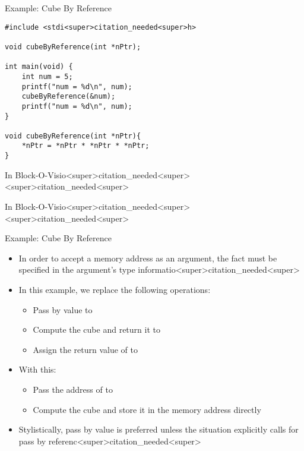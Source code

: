 \documentclass[11pt]{beamer}
\let\OldTexttt\texttt
\renewcommand{\texttt}[1]{\OldTexttt{\color{teal}{#1}}}
\begin{document}
\begin{frame}[fragile=singleslide]{Example: Cube By Reference}
\begin{lstlisting}[style=C]
#include <stdi<super>citation_needed<super>h>

void cubeByReference(int *nPtr);

int main(void) {
	int num = 5;
	printf("num = %d\n", num);
	cubeByReference(&num);
	printf("num = %d\n", num);
}

void cubeByReference(int *nPtr){
	*nPtr = *nPtr * *nPtr * *nPtr;
}
\end{lstlisting}
\end{frame}

\begin{frame}{In Block-O-Visio<super>citation_needed<super><super>citation_needed<super>}
\center
\
\end{frame}

\begin{frame}{In Block-O-Visio<super>citation_needed<super><super>citation_needed<super>}
\center
\
\end{frame}

\begin{frame}[fragile=singleslide]{Example: Cube By Reference}
\begin{itemize}
\item In order to accept a memory address as an argument, the fact must be specified in the argument's type informatio<super>citation_needed<super>
\item In this example, we replace the following operations: 
\begin{itemize}
\item Pass \texttt{num} by value to \texttt{cubeByReference}
\item Compute the cube and return it to \texttt{main}
\item Assign the return value of \texttt{cubeByReference} to \texttt{num}
\end{itemize}
\item With this:
\begin{itemize}
\item Pass the address of \texttt{num} to \texttt{cubeByReference}
\item Compute the cube and store it in the memory address directly
\end{itemize}
\item Stylistically, pass by value is preferred unless the situation explicitly calls for pass by referenc<super>citation_needed<super>
\begin{itemize}
\item Passing by reference in this way violates the \textbf{principle of least privilege<super>citation_needed<super>
\end{itemize}
\end{itemize}
\end{frame}
\end{document}
